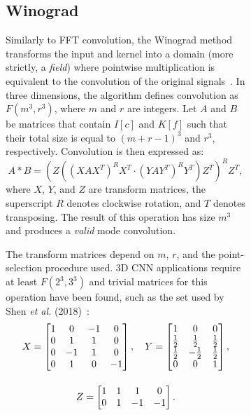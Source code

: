 \begin{figure}[!tb]
\begin{figure}[!tb]
  \subsection{Winograd}
    Similarly to FFT convolution, the Winograd method transforms the input and kernel into a domain (more strictly, a \textit{field}) where pointwise multiplication is equivalent to the convolution of the original signals~\cite{lavin2016fast}. In three dimensions, the algorithm defines convolution as $F(m^3,r^3)$, where $m$ and $r$ are integers. Let $A$ and $B$ be matrices that contain $I[c]$ and $K[f]$ such that their total size is equal to $(m+r-1)^3$ and $r^3$, respectively. Convolution is then expressed as:
    \begin{equation*}
      A * B  = (Z( (XAX^T)^RX^T \cdot (YAY^T)^RY^T )Z^T)^RZ^T,
    \end{equation*}
    where $X$, $Y$, and $Z$ are transform matrices, the superscript $R$ denotes clockwise rotation, and $T$ denotes transposing. The result of this operation has size $m^3$ and produces a \textit{valid} mode convolution.

    The transform matrices depend on $m$, $r$, and the point-selection procedure used. 3D CNN applications require at least $F(2^3,3^3)$ and trivial matrices for this operation have been found, such as the set used by Shen \textit{et al.} (2018)~\cite{shen2018towards}:
    \begin{equation*}
      \begin{gathered}
        X = 
        \begin{bmatrix}
          1 &  0 & -1 &  0\\
          0 &  1 &  1 &  0\\
          0 & -1 &  1 &  0\\
          0 &  1 &  0 & -1
        \end{bmatrix},\quad
        Y = 
        \begin{bmatrix}
          1 & 0 & 0\\
          \frac{1}{2} & \frac{1}{2} & \frac{1}{2}\\
          \frac{1}{2} & -\frac{1}{2} & \frac{1}{2}\\
          0 & 0 & 1
        \end{bmatrix},\\\rule{0pt}{6ex}
        Z = 
        \begin{bmatrix}
          1 &  1 &  1 &  0\\
          0 &  1 & -1 & -1
        \end{bmatrix}.
      \end{gathered}
    \end{equation*}


\end{figure}
\end{figure}
